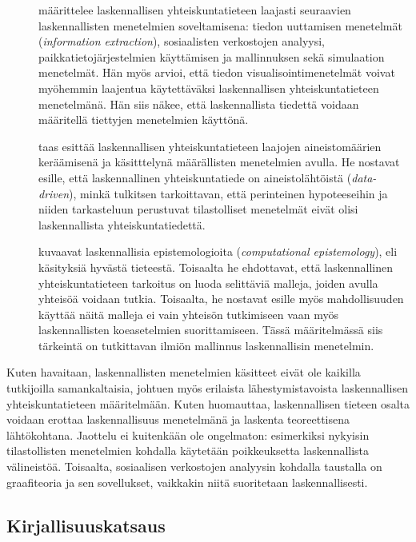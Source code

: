 \documentclass[finnish,gradu,twoside,12pt]{tktltiki}
\begin{document}
\begin{description}
\item[\citet{cioffi-revilla10}] määrittelee laskennallisen yhteiskuntatieteen laajasti seuraavien laskennallisten menetelmien soveltamisena: tiedon uuttamisen menetelmät (\textit{information extraction}), sosiaalisten verkostojen analyysi, paikkatietojärjestelmien käyttämisen ja mallinnuksen sekä simulaation menetelmät. Hän myös arvioi, että tiedon visualisointimenetelmät voivat myöhemmin laajentua käytettäväksi laskennallisen yhteiskuntatieteen menetelmänä. Hän siis näkee, että laskennallista tiedettä voidaan määritellä tiettyjen menetelmien käyttönä.
\item[\citet{lazer09}] taas esittää laskennallisen yhteiskuntatieteen laajojen aineistomäärien keräämisenä ja käsitttelynä määrällisten menetelmien avulla. He nostavat esille, että laskennallinen yhteiskuntatiede on aineistolähtöistä (\textit{data-driven}), minkä tulkitsen tarkoittavan, että perinteinen hypoteeseihin ja niiden tarkasteluun perustuvat tilastolliset menetelmät eivät olisi laskennallista yhteiskuntatiedettä.
\item[\cite{bankes02}] kuvaavat laskennallisia epistemologioita (\textit{computational epistemology}), eli käsityksiä hyvästä tieteestä. Toisaalta he ehdottavat, että laskennallinen yhteiskuntatieteen tarkoitus on luoda selittäviä malleja, joiden avulla yhteisöä voidaan tutkia. Toisaalta, he nostavat esille myös mahdollisuuden käyttää näitä malleja ei vain yhteisön tutkimiseen vaan myös laskennallisten koeasetelmien suorittamiseen. Tässä määritelmässä siis tärkeintä on tutkittavan ilmiön mallinnus laskennallisin menetelmin.
\end{description}

Kuten havaitaan, laskennallisten menetelmien käsitteet eivät ole kaikilla tutkijoilla samankaltaisia, johtuen myös erilaista lähestymistavoista laskennallisen yhteiskuntatieteen määritelmään. Kuten \citet{cioffi-revilla10} huomauttaa, laskennallisen tieteen osalta voidaan erottaa laskennallisuus menetelmänä ja laskenta teoreettisena lähtökohtana. Jaottelu ei kuitenkään ole ongelmaton: esimerkiksi nykyisin tilastollisten menetelmien kohdalla käytetään poikkeuksetta laskennallista välineistöä. Toisaalta, sosiaalisen verkostojen analyysin kohdalla taustalla on graafiteoria ja sen sovellukset, vaikkakin niitä suoritetaan laskennallisesti.

\subsection{Kirjallisuuskatsaus}
\end{document}
